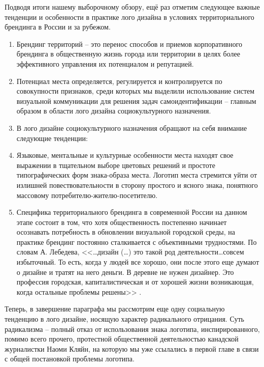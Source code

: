 Подводя итоги нашему выборочному обзору, ещё раз отметим следующее важные тенденции и особенности в
практике лого дизайна в условиях территориального брендинга в России и за рубежом.
\begin{enumerate}
\item Брендинг территорий -- это перенос способов и приемов корпоративного брендинга в общественную
  жизнь города или территории  в целях более эффективного управления их потенциалом и репутацией.
\item Потенциал места определяется, регулируется и контролируется по совокупности признаков, среди
  которых мы выделили использование систем визуальной коммуникации для решения задач
  самоидентификации -- главным образом в области лого дизайна социокультурного назначения.
\item В лого дизайне социокультурного назначения обращают на себя внимание следующие тенденции:
\item Языковые, ментальные и культурные особенности места находят свое выражении в тщательном выборе
  цветовых решений и простоте типографических форм знака-образа места. Логотип места стремится уйти
  от излишней повествовательности в сторону простого и ясного знака, понятного массовому
  потребителю-жителю-посетителю.
\item Специфика территориального брендинга в современной России на данном этапе состоит в том, что
  хотя общественность постепенно начинает осознавать потребность в обновлении визуальной городской
  среды, на практике брендинг постоянно сталкивается с объективными трудностями. По словам
  А. Лебедева, <<\ldots дизайн (\ldots) это такой род деятельности\ldots совсем избыточный. То есть,
  когда у людей все хорошо, они после этого еще думают о дизайне и тратят на него деньги. В деревне
  не нужен дизайнер. Это профессия городская, капиталистическая и от хорошей жизни возникающая,
  когда остальные проблемы решены>> \autocite{link:plushev}.
\end{enumerate}

Теперь, в завершение параграфа мы рассмотрим еще одну социальную тенденцию в лого дизайне, носящую
характер радикального отрицания. Суть радикализма – полный отказ от использования знака логотипа,
инспирированного, помимо всего прочего, протестной общественной деятельностью канадской журналистки
Наоми Кляйн, на которую мы уже ссылались в первой главе в связи с общей постановкой проблемы
логотипа.

